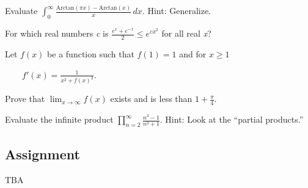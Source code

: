 \documentclass{article}
\begin{document}
 Evaluate { } \(\int_0^{\infty } \frac{\text{Arctan}(\pi  x)-\text{Arctan}(x)}{x} \, dx\). { } Hint: Generalize.

 For which real numbers \textit{ c} is \(\frac{e^x+ e^{-x}}{2}\leq e^{c x^2}\) { }for all real \textit{ x}?

 Let \(f(x)\) be a function such that \(f(1)=1\) and for \(x\geq 1\)



$\quad \quad $\(f'(x)=\frac{1}{x^2+ f(x)^2}\).



Prove that \(\lim_{x\to \infty } f(x)\) exists and is less than \(1+\frac{\pi }{4}\).

 { }Evaluate the infinite product \(\prod _{n=2}^{\infty } \frac{n^3-1}{n^3+1}\). { }Hint: Look at the {``}partial products.{''}\\



\subsection{Assignment}



TBA
\end{document}
